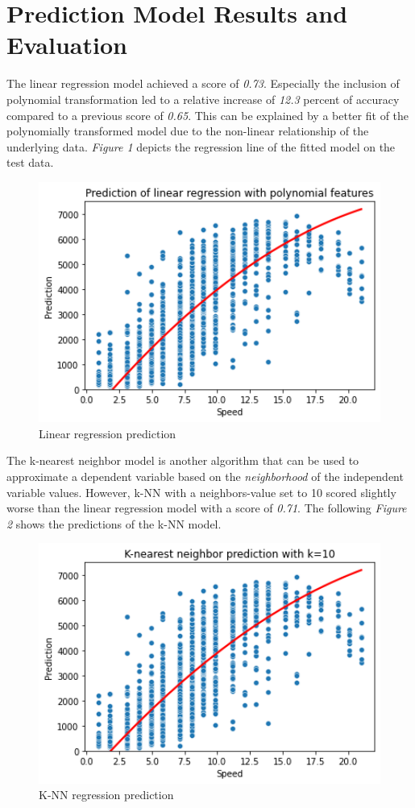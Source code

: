 \documentclass[12pt, a4paper]{article}
\begin{document}
\section{Prediction Model Results and Evaluation}

The linear regression model achieved a score of \emph{0.73}. Especially the inclusion of polynomial transformation led to a relative increase of \emph{12.3} percent of accuracy compared to a previous score of \emph{0.65}. This can be explained by a better fit of the polynomially transformed model due to the non-linear relationship of the underlying data. \emph{Figure 1} depicts the regression line of the fitted model on the test data.

\begin{figure}[htp]
    \centering
    \includegraphics[width=12cm]{output_ln.png}
    \caption{Linear regression prediction}
    \label{fig:galaxy}
\end{figure}

The k-nearest neighbor model is another algorithm that can be used to approximate a dependent variable based on the \emph{neighborhood} of the independent variable values. However, k-NN with a neighbors-value set to 10 scored slightly worse than the linear regression model with a score of \emph{0.71}. The following \emph{Figure 2} shows the predictions of the k-NN model.

\begin{figure}[htp]
    \centering
    \includegraphics[width=12cm]{output_KNN.png}
    \caption{K-NN regression prediction}
    \label{fig:galaxy}
\end{figure}
\end{document}
